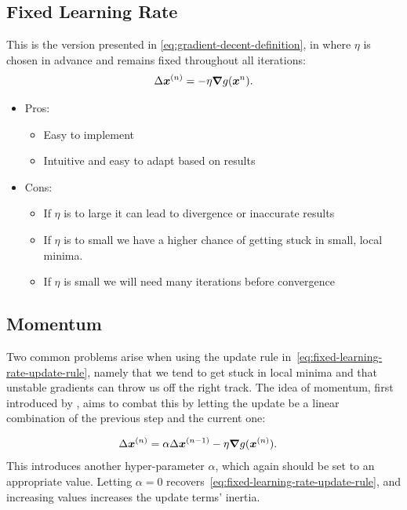 \documentclass[Thesis.tex]{subfiles}
\begin{document}
\subsection{Fixed Learning Rate}

This is the version presented in \cref{eq:gradient-decent-definition}, in where
$\eta$ is chosen in advance and remains fixed throughout all iterations:
\begin{align}
  \label{eq:fixed-learning-rate-update-rule}
  \Delta \bm{x}^{(n)} = -\eta \grad{g(\bm{x}^{n})}.
\end{align}

\begin{itemize}
\item Pros:
  \begin{itemize}
    \item Easy to implement
    \item Intuitive and easy to adapt based on results
  \end{itemize}
\item Cons:
  \begin{itemize}
    \item If $\eta$ is to large it can lead to divergence or inaccurate results
    \item If $\eta$ is to small we have a higher chance of getting stuck in small, local minima.
    \item If $\eta$ is small we will need many iterations before convergence
  \end{itemize}
\end{itemize}

\subsection{Momentum}

Two common problems arise when using the update rule
in~\cref{eq:fixed-learning-rate-update-rule}, namely that we tend to get stuck
in local minima and that unstable gradients can throw us off the right track.
The idea of momentum, first introduced by \textcite{Rumelhart-1986}, aims to
combat this by letting the update be a linear combination of the previous step
and the current one:

\begin{align}
  \label{eq:momentum-update-rule-def}
  \Delta\bm{x}^{(n)} &= \alpha \Delta \bm{x}^{(n-1)} - \eta \grad{g(\bm{x}^{(n)})}.
\end{align}
This introduces another hyper-parameter $\alpha$, which again should be set to
an appropriate value. Letting $\alpha=0$
recovers~\cref{eq:fixed-learning-rate-update-rule}, and increasing values
increases the update terms' inertia.
\end{document}

